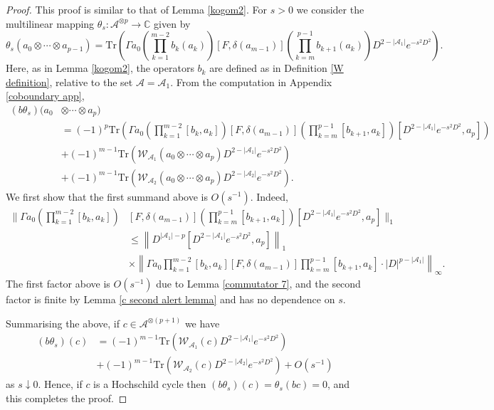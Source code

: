     \begin{proof} 
        This proof is similar to that of Lemma \ref{kogom2}. For $s > 0$ we consider the multilinear mapping $\theta_s:\mathcal{A}^{\otimes p}\to \mathbb{C}$ given by
        \begin{equation*}
            \theta_s(a_0\otimes\cdots\otimes a_{p-1}) = \mathrm{Tr}\left(\Gamma a_0\left(\prod_{k=1}^{m-2}b_k(a_k)\right)[F,\delta(a_{m-1})]\left(\prod_{k=m}^{p-1}b_{k+1}(a_k)\right)D^{2-|\mathscr{A}_1|}e^{-s^2D^2}\right).
        \end{equation*}
        Here, as in Lemma \ref{kogom2}, the operators $b_k$ are defined as in Definition \ref{W definition}, relative to the set $\mathscr{A} = \mathscr{A}_1$. From the computation in Appendix \ref{coboundary app},
        \begin{align*}
            (b\theta_s)(a_0&\otimes\cdots\otimes a_p)\\
                           &= (-1)^p\mathrm{Tr}\left(\Gamma a_0\left(\prod_{k=1}^{m-2}[b_k,a_k]\right)[F,\delta(a_{m-1})]\left(\prod_{k=m}^{p-1}[b_{k+1},a_k]\right)[D^{2-|\mathscr{A}_1|}e^{-s^2D^2},a_p]\right)\\
                           &+ (-1)^{m-1}\mathrm{Tr}(\mathcal{W}_{\mathscr{A}_1}(a_0\otimes\cdots\otimes a_p)D^{2-|\mathscr{A}_1|}e^{-s^2D^2})\\
                           &+ (-1)^{m-1}\mathrm{Tr}(\mathcal{W}_{\mathscr{A}_2}(a_0\otimes\cdots\otimes a_p)D^{2-|\mathscr{A}_2|}e^{-s^2D^2}).
        \end{align*}
        We first show that the first summand above is $O(s^{-1})$. Indeed,
        \begin{align*}       
            \Big\|\Gamma a_0\left(\prod_{k=1}^{m-2}[b_k,a_k]\right)&[F,\delta(a_{m-1})]\left(\prod_{k=m}^{p-1}[b_{k+1},a_k]\right)[D^{2-|\mathscr{A}_1|}e^{-s^2D^2},a_p]\Big\|_1\\
                                                                   &\leq \left\|D^{|\mathscr{A}_1|-p}[D^{2-|\mathscr{A}_1|}e^{-s^2D^2},a_p]\right\|_1\\
                                                                   &\times\left\|\Gamma a_0\prod_{k=1}^{m-2}[b_k,a_k][F,\delta(a_{m-1})]\prod_{k=m}^{p-1}[b_{k+1},a_k]\cdot|D|^{p-|\mathscr{A}_1|}\right\|_{\infty}.
        \end{align*}
        The first factor above is $O(s^{-1})$ due to Lemma \ref{commutator 7}, and the second factor is finite by Lemma \ref{c second alert lemma} and has no dependence on $s$.
        
        Summarising the above, if $c \in \mathcal{A}^{\otimes (p+1)}$ we have
        \begin{align*}
            (b\theta_s)(c) &= (-1)^{m-1}\mathrm{Tr}(\mathcal{W}_{\mathscr{A}_1}(c)D^{2-|\mathscr{A}_1|}e^{-s^2D^2})\\
                           &+(-1)^{m-1}\mathrm{Tr}(\mathcal{W}_{\mathscr{A}_2}(c)D^{2-|\mathscr{A}_2|}e^{-s^2D^2})+ O(s^{-1})
        \end{align*}
        as $s\downarrow 0$. Hence, if $c$ is a Hochschild cycle then $(b\theta_s)(c) = \theta_s(bc) = 0$, and this completes the proof.
    \end{proof}

